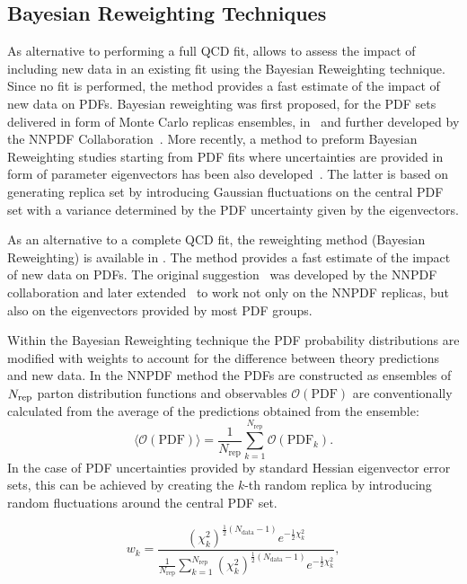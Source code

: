 \subsection{Bayesian Reweighting Techniques}
As alternative to performing a full QCD fit, \fitter allows to assess the impact of including new
data in an existing fit using the Bayesian Reweighting technique. Since no fit is performed, the method
provides a fast estimate of the impact of new data on PDFs. 
Bayesian reweighting was first proposed, for the PDF sets delivered in form of Monte Carlo replicas ensembles, in~\cite{Giele:1998gw} and further developed by the NNPDF Collaboration~\cite{Ball:2011gg,Ball:2010gb}. 
More recently, a method to preform Bayesian Reweighting studies starting from PDF fits where uncertainties
are provided in form of parameter eigenvectors has been also developed~\cite{Watt:2012tq}. The latter is 
based on generating replica set by introducing Gaussian fluctuations on the central PDF set with a variance
determined by the PDF uncertainty given by the eigenvectors.

As an alternative to a complete QCD fit, the reweighting method (Bayesian Reweighting) is available in \fitter.
The method provides a fast estimate of the impact of new data on PDFs. 
The original suggestion~\cite{Giele:1998gw} was developed by the NNPDF 
collaboration \cite{Ball:2011gg,Ball:2010gb} and later extended~\cite{Watt:2012tq}
to work not only on the NNPDF replicas, but also on the eigenvectors provided by most PDF groups. 

Within the Bayesian Reweighting technique the PDF probability distributions are modified with weights 
to account for the difference between theory predictions and new data.
In the NNPDF method the PDFs are constructed as ensembles of $N_{\rm rep}$ parton 
distribution functions and observables $\mathcal{O}(\mathrm{PDF})$ are conventionally calculated from the average
of the predictions obtained from the ensemble: 
\begin{equation}
\langle\mathcal{O}(\mathrm{PDF})\rangle =  \frac{1}{N_{\mathrm{rep}}} \sum_{k=1}^{N_{\mathrm{rep}}} \mathcal{O}(\mathrm{PDF}_k).
\end{equation}
In the case of PDF uncertainties provided by standard Hessian eigenvector error sets, this can be achieved 
by creating the $k$-th random replica by introducing random fluctuations around the central PDF set.

\begin{equation}
 w_k = \frac{(\chi^2_k)^{\frac{1}{2} (N_{\mathrm{data}}-1) } e^{-\frac{1}{2}\chi^2_k}}{ \frac{1}{N_{\mathrm{rep}}} \sum^{N_{\mathrm{rep}}}_{k=1}(\chi^2_k)^{\frac{1}{2}(N_{\mathrm{data}}-1)} e^{-\frac{1}{2}\chi^2_k}  },
\end{equation}

